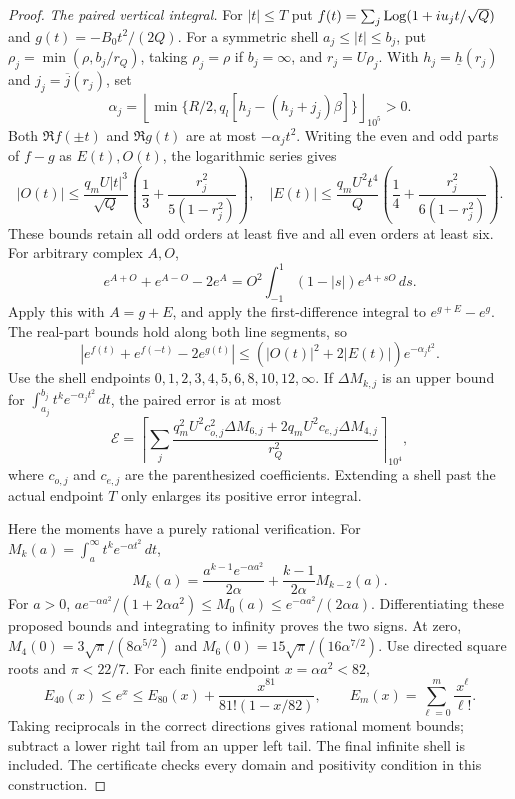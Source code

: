 \begin{proof}
\smallskip
\noindent\emph{The paired vertical integral.}
For $|t|\le T$ put
$f(t)=\sum_j\operatorname{Log}(1+iu_jt/\sqrt Q)$ and
$g(t)=-B_0t^2/(2Q)$. For a symmetric shell
$a_j\le|t|\le b_j$, put
$\rho_j=\min(\rho,b_j/r_Q)$, taking $\rho_j=\rho$ if $b_j=\infty$,
and $r_j=U\rho_j$. With $h_j=\underline h(r_j)$ and
$j_j=\overline j(r_j)$, set
\[
 \alpha_j=\left\lfloor\min\{R/2,
                q_l[h_j-(h_j+j_j)\beta]\}\right\rfloor_{10^5}>0.
\]
Both $\Re f(\pm t)$ and $\Re g(t)$ are at most $-\alpha_jt^2$.
Writing the even and odd parts of $f-g$ as $E(t),O(t)$,
the logarithmic series gives
\[
 |O(t)|\le\frac{q_mU|t|^3}{\sqrt Q}
       \left(\frac13+\frac{r_j^2}{5(1-r_j^2)}\right),\quad
 |E(t)|\le\frac{q_mU^2t^4}{Q}
       \left(\frac14+\frac{r_j^2}{6(1-r_j^2)}\right).
\]
These bounds retain all odd orders at least five and all even
orders at least six. For arbitrary complex $A,O$,
\[
 e^{A+O}+e^{A-O}-2e^A
 =O^2\int_{-1}^1(1-|s|)e^{A+sO}\,ds.
\]
Apply this with $A=g+E$, and apply the first-difference integral
to $e^{g+E}-e^g$. The real-part bounds hold along both line
segments, so
\[
 |e^{f(t)}+e^{f(-t)}-2e^{g(t)}|
 \le(|O(t)|^2+2|E(t)|)e^{-\alpha_jt^2}.
\]
Use the shell endpoints $0,1,2,3,4,5,6,8,10,12,\infty$.
If $\Delta M_{k,j}$ is an upper bound for
$\int_{a_j}^{b_j}t^ke^{-\alpha_jt^2}\,dt$, the
paired error is at most
\[
 \mathcal E=\left\lceil\sum_j
 \frac{q_m^2U^2c_{o,j}^2\Delta M_{6,j}
          +2q_mU^2c_{e,j}\Delta M_{4,j}}{r_Q^2}
                      \right\rceil_{10^4},
\]
where $c_{o,j}$ and $c_{e,j}$ are the parenthesized coefficients.
Extending a shell past the actual endpoint $T$ only enlarges its
positive error integral.

Here the moments have a purely rational verification. For
$M_k(a)=\int_a^\infty t^ke^{-\alpha t^2}\,dt$,
\[
 M_k(a)=\frac{a^{k-1}e^{-\alpha a^2}}{2\alpha}
          +\frac{k-1}{2\alpha}M_{k-2}(a).
\]
For $a>0$,
$ae^{-\alpha a^2}/(1+2\alpha a^2)\le M_0(a)
 \le e^{-\alpha a^2}/(2\alpha a)$.
Differentiating these proposed bounds and integrating to infinity
proves the two signs. At zero,
$M_4(0)=3\sqrt\pi/(8\alpha^{5/2})$ and
$M_6(0)=15\sqrt\pi/(16\alpha^{7/2})$.
Use directed square roots and $\pi<22/7$.
For each finite endpoint $x=\alpha a^2<82$,
\[
 E_{40}(x)\le e^x\le E_{80}(x)
               +\frac{x^{81}}{81!(1-x/82)},\qquad
 E_m(x)=\sum_{\ell=0}^m\frac{x^\ell}{\ell!}.
\]
Taking reciprocals in the correct directions gives rational
moment bounds; subtract a lower right tail from an upper left
tail. The final infinite shell is included. The certificate
checks every domain and positivity condition in this construction.


\end{proof}
